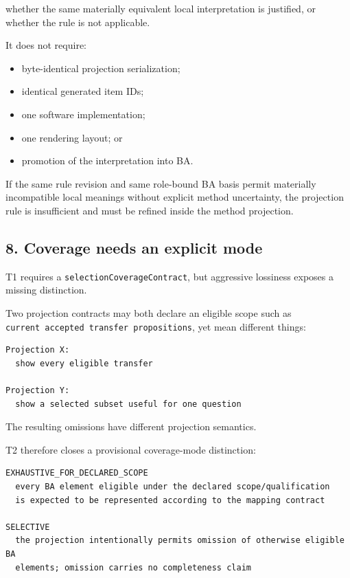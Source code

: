 \documentclass[11pt,a4paper]{article}
\providecommand{\tightlist}{\setlength{\itemsep}{0pt}\setlength{\parskip}{0pt}}
\begin{document}
whether the same materially equivalent local interpretation is
justified, or whether the rule is not applicable.

It does not require:

\begin{itemize}
\tightlist
\item
  byte-identical projection serialization;
\item
  identical generated item IDs;
\item
  one software implementation;
\item
  one rendering layout; or
\item
  promotion of the interpretation into BA.
\end{itemize}

If the same rule revision and same role-bound BA basis permit materially
incompatible local meanings without explicit method uncertainty, the
projection rule is insufficient and must be refined inside the method
projection.

\subsection{8. Coverage needs an explicit
mode}\label{8-coverage-needs-an-explicit-mode}

T1 requires a \texttt{selectionCoverageContract}, but aggressive
lossiness exposes a missing distinction.

Two projection contracts may both declare an eligible scope such as
\texttt{current\ accepted\ transfer\ propositions}, yet mean different
things:

\begin{verbatim}
Projection X:
  show every eligible transfer

Projection Y:
  show a selected subset useful for one question
\end{verbatim}

The resulting omissions have different projection semantics.

T2 therefore closes a provisional coverage-mode distinction:

\begin{verbatim}
EXHAUSTIVE_FOR_DECLARED_SCOPE
  every BA element eligible under the declared scope/qualification
  is expected to be represented according to the mapping contract

SELECTIVE
  the projection intentionally permits omission of otherwise eligible BA
  elements; omission carries no completeness claim
\end{verbatim}
\end{document}
